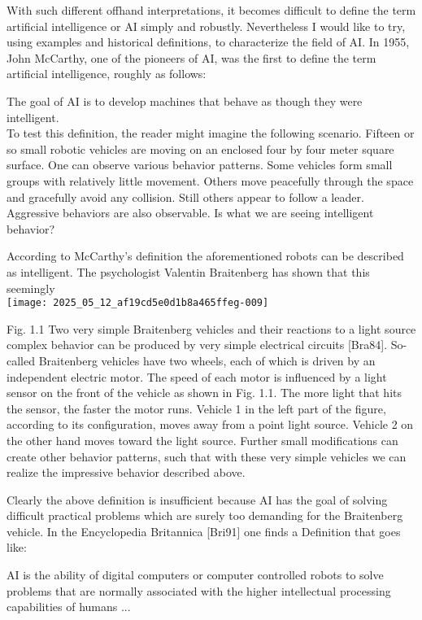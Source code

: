 \documentclass[10pt]{article}
\begin{document}
With such different offhand interpretations, it becomes difficult to define the term artificial intelligence or AI simply and robustly. Nevertheless I would like to try, using examples and historical definitions, to characterize the field of AI. In 1955, John McCarthy, one of the pioneers of AI, was the first to define the term artificial intelligence, roughly as follows:

The goal of AI is to develop machines that behave as though they were intelligent.\\
To test this definition, the reader might imagine the following scenario. Fifteen or so small robotic vehicles are moving on an enclosed four by four meter square surface. One can observe various behavior patterns. Some vehicles form small groups with relatively little movement. Others move peacefully through the space and gracefully avoid any collision. Still others appear to follow a leader. Aggressive behaviors are also observable. Is what we are seeing intelligent behavior?

According to McCarthy's definition the aforementioned robots can be described as intelligent. The psychologist Valentin Braitenberg has shown that this seemingly\\
\texttt{[image: 2025\_05\_12\_af19cd5e0d1b8a465ffeg-009]}

Fig. 1.1 Two very simple Braitenberg vehicles and their reactions to a light source\\[0pt]
complex behavior can be produced by very simple electrical circuits [Bra84]. So-called Braitenberg vehicles have two wheels, each of which is driven by an independent electric motor. The speed of each motor is influenced by a light sensor on the front of the vehicle as shown in Fig. 1.1. The more light that hits the sensor, the faster the motor runs. Vehicle 1 in the left part of the figure, according to its configuration, moves away from a point light source. Vehicle 2 on the other hand moves toward the light source. Further small modifications can create other behavior patterns, such that with these very simple vehicles we can realize the impressive behavior described above.

Clearly the above definition is insufficient because AI has the goal of solving difficult practical problems which are surely too demanding for the Braitenberg vehicle. In the Encyclopedia Britannica [Bri91] one finds a Definition that goes like:

\begin{displayquote}
AI is the ability of digital computers or computer controlled robots to solve problems that are normally associated with the higher intellectual processing capabilities of humans ...
\end{displayquote}
\end{document}
